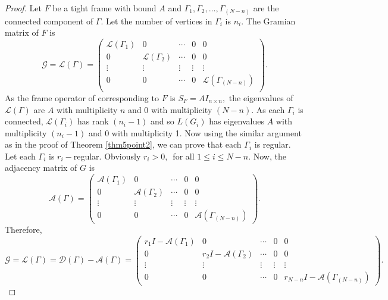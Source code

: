 \documentclass[10pt,a4paper]{amsart}
\begin{document}
\begin{proof}
	Let $F$ be a tight frame with bound $A$ and $\Gamma_1, \Gamma_2,\ldots, \Gamma_{(N-n)}$ are the connected component of $\Gamma.$ Let the number of vertices in $\Gamma_i$ is $n_i.$ The Gramian matrix of $F$ is $$\mathcal{G} = \mathcal{L}(\Gamma) = \begin{pmatrix}
		\mathcal{L}(\Gamma_1) & 0  & \cdots &0 &0\\
		0 & \mathcal{L}(\Gamma_2)  & \cdots &0 &0 \\
		\vdots &\vdots  &\vdots &\vdots &\vdots \\
		0 & 0  & \cdots &0 &  \mathcal{L}(\Gamma_{(N-n)}) \\
		
	\end{pmatrix}.$$ 
As the frame operator of corresponding to $F$ is $S_F = AI_{n\times n},$ the eigenvalues of $\mathcal{L}(\Gamma)$ are $A$ with multiplicity $n$ and $0$ with multiplicity $(N-n).$ As each $\Gamma_i$ is connected, $\mathcal{L}(\Gamma_i)$ has rank $(n_i -1)$ and so $L(G_i) $ has eigenvalues $A$ with multiplicity $(n_i -1)$ and  $0$ with multiplicity 1. Now using the similar argument as in the proof of Theorem  \ref{thm5point2}, we can prove that each $\Gamma_i$ is regular. Let each $\Gamma_i$ is $r_i -$regular. Obviously $r_i > 0,\,$ for all $1 \leq i \leq N-n.$ Now, the adjacency matrix of $G$ is $$\mathcal{A}(\Gamma) =  \begin{pmatrix}
	\mathcal{A}(\Gamma_1) & 0  & \cdots &0 &0\\
	0 & \mathcal{A}(\Gamma_2)  & \cdots &0 &0 \\
	\vdots &\vdots  &\vdots &\vdots &\vdots \\
	0 & 0  & \cdots &0 &  \mathcal{A}(\Gamma_{(N-n)})\end{pmatrix} .$$ 
	Therefore, 
	$$ \mathcal{G} = \mathcal{L}(\Gamma) = \mathcal{D}(\Gamma) - \mathcal{A}(\Gamma) = \begin{pmatrix}
		r_{1}I - \mathcal{A}(\Gamma_1) & 0  & \cdots &0 &0\\
		0 & r_{2}I - \mathcal{A}(\Gamma_2)  & \cdots &0 &0 \\
		\vdots &\vdots  &\vdots &\vdots &\vdots \\
		0 & 0  & \cdots &0 &  r_{N-n}I - \mathcal{A}(\Gamma_{(N-n)})\end{pmatrix} .$$
	

\end{proof}
\end{document}
